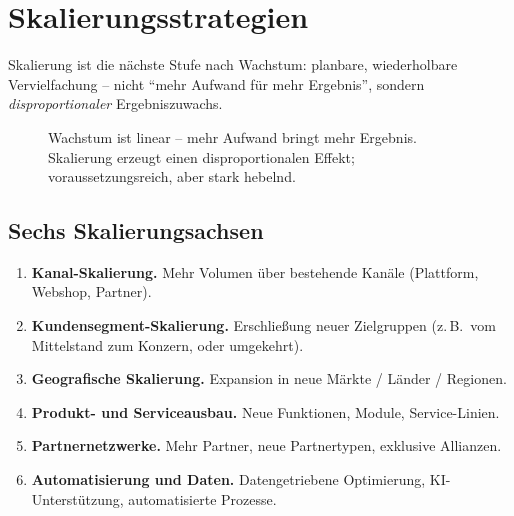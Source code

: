 \documentclass[11pt,a4paper,oneside]{article}
\newcommand{\fachbegriff}[1]{\textbf{#1}}
\begin{document}
\section{Skalierungsstrategien}

Skalierung ist die nächste Stufe nach Wachstum: planbare, wiederholbare Vervielfachung -- nicht ``mehr Aufwand für mehr Ergebnis'', sondern \emph{disproportionaler} Ergebniszuwachs.

\begin{figure}[h]
\centering
{}
\caption{\sffamily Wachstum ist linear -- mehr Aufwand bringt mehr Ergebnis. Skalierung erzeugt einen disproportionalen Effekt; voraussetzungsreich, aber stark hebelnd.}
\label{fig:scale-22t12}
\end{figure}

\subsection{Sechs Skalierungsachsen}

\begin{enumerate}
  \item \fachbegriff{Kanal-Skalierung.} Mehr Volumen über bestehende Kanäle (Plattform, Webshop, Partner).
  \item \fachbegriff{Kundensegment-Skalierung.} Erschließung neuer Zielgruppen (z.\,B.\ vom Mittelstand zum Konzern, oder umgekehrt).
  \item \fachbegriff{Geografische Skalierung.} Expansion in neue Märkte / Länder / Regionen.
  \item \fachbegriff{Produkt- und Serviceausbau.} Neue Funktionen, Module, Service-Linien.
  \item \fachbegriff{Partnernetzwerke.} Mehr Partner, neue Partnertypen, exklusive Allianzen.
  \item \fachbegriff{Automatisierung und Daten.} Datengetriebene Optimierung, KI-Unterstützung, automatisierte Prozesse.
\end{enumerate}
\end{document}
